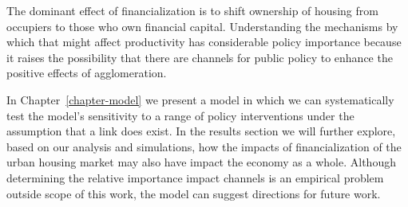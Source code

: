 The dominant effect of financialization is to shift ownership of housing from occupiers to those who own financial capital. Understanding the mechanisms by which that might affect productivity has considerable policy importance because it raises the possibility that there are channels for public policy to enhance the positive effects of agglomeration. 

In  Chapter~\ref{chapter-model} we present a model in which we can systematically test the model's sensitivity to a range of policy interventions under the assumption that a link does exist. %
In the results section we will further explore, based on our analysis and simulations, how the %
impacts of financialization of the urban housing market may also have impact %
the economy as a whole. Although determining the relative importance impact channels %
is an empirical problem outside scope of this work, %
the model can suggest directions for future work.





